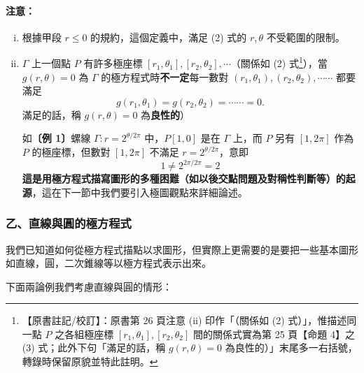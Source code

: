 \paragraph{注意：}
\begin{enumerate}[(i)]
  \item 根據甲段 $r \le 0$ 的規約，這個定義中，滿足 (2) 式的 $r, \theta$ 不受範圍的限制。
  \item $\Gamma$ 上一個點 $P$ 有許多極座標 $[r_1, \theta_1], [r_2, \theta_2], \cdots$（關係如 (2) 式\label{note:b5-ch1-p26-note}\footnote{【原書註記/校訂】：原書第 26 頁注意 (ii) 印作「（關係如 (2) 式）」，惟描述同一點 $P$ 之各組極座標 $[r_1, \theta_1], [r_2, \theta_2]$ 間的關係式實為第 25 頁【命題 4】之 (3) 式；此外下句「滿足的話，稱 $g(r, \theta) = 0$ 為良性的）」末尾多一右括號，轉錄時保留原貌並特此註明。}），當 $g(r, \theta) = 0$ 為 $\Gamma$ 的極方程式時\textbf{不一定}每一數對 $(r_1, \theta_1), (r_2, \theta_2), \cdots\cdots$ 都要滿足
  \[
    g(r_1, \theta_1) = g(r_2, \theta_2) = \cdots\cdots = 0.
  \]
  滿足的話，稱 $g(r, \theta) = 0$ 為\textbf{良性的}）

  如\textbf{〔例 1〕}螺線 $\Gamma : r = 2^{\theta/2\pi}$ 中，$P[1, 0]$ 是在 $\Gamma$ 上，而 $P$ 另有 $[1, 2\pi]$ 作為 $P$ 的極座標，但數對 $[1, 2\pi]$ 不滿足 $r = 2^{\theta/2\pi}$，意即
  \[
    1 \neq 2^{2\pi/2\pi} = 2
  \]
  \textbf{這是用極方程式描寫圖形的多種困難（如以後交點問題及對稱性判斷等）的起源}，這在下一節中我們要引入極圖觀點來詳細論述。
\end{enumerate}

\subsubsection*{乙、直線與圓的極方程式}\label{subsec:b5-1-3-b}

我們已知道如何從極方程式描點以求圖形，但實際上更需要的是要把一些基本圖形如直線，圓，二次錐線等以極方程式表示出來。

下面兩論例我們考慮直線與圓的情形：

